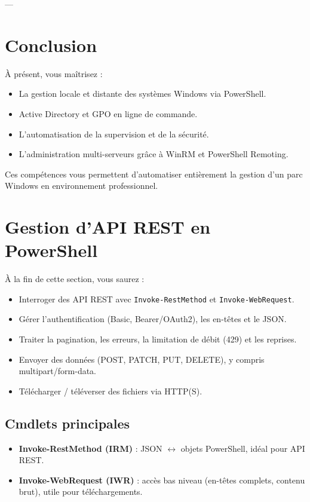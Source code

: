 \documentclass[a4paper,12pt]{article}
\begin{document}
---

\section{Conclusion}
\begin{tcolorbox}[colback=blue!5!white,colframe=blue!75!black]
À présent, vous maîtrisez :
\begin{itemize}
  \item La gestion locale et distante des systèmes Windows via PowerShell.
  \item Active Directory et GPO en ligne de commande.
  \item L’automatisation de la supervision et de la sécurité.
  \item L’administration multi-serveurs grâce à WinRM et PowerShell Remoting.
\end{itemize}
Ces compétences vous permettent d’automatiser entièrement la gestion d’un parc Windows en environnement professionnel.
\end{tcolorbox}


\section{Gestion d’API REST en PowerShell}
\label{sec:ps-rest}
\begin{tcolorbox}[colback=blue!5!white,colframe=blue!75!black,title=Objectifs]
À la fin de cette section, vous saurez :
\begin{itemize}
  \item Interroger des API REST avec \texttt{Invoke-RestMethod} et \texttt{Invoke-WebRequest}.
  \item Gérer l’authentification (Basic, Bearer/OAuth2), les en-têtes et le JSON.
  \item Traiter la pagination, les erreurs, la limitation de débit (429) et les reprises.
  \item Envoyer des données (POST, PATCH, PUT, DELETE), y compris multipart/form-data.
  \item Télécharger / téléverser des fichiers via HTTP(S).
\end{itemize}
\end{tcolorbox}

\subsection{Cmdlets principales}
\begin{itemize}
  \item \textbf{Invoke-RestMethod (IRM)} : JSON $\leftrightarrow$ objets PowerShell, idéal pour API REST.
  \item \textbf{Invoke-WebRequest (IWR)} : accès bas niveau (en-têtes complets, contenu brut), utile pour téléchargements.
\end{itemize}
\end{document}
